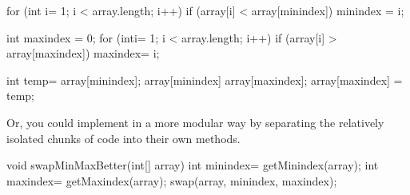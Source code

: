 \documentclass{report}
\begin{document}
\begin{itemize}
\begin{cppcode}
                for (int i= 1; i < array.length; i++) {
                    if (array[i] < array[minindex]) {
                        minindex = i;
                    }
                }

                int maxindex = 0;
                for (inti= 1; i < array.length; i++) {
                    if (array[i] > array[maxindex]) {
                        maxindex= i;
                    }
                }

                int temp= array[minindex];
                array[minindex] array[maxindex];
                array[maxindex] = temp;
            \end{cppcode}
            \bigbreak \noindent 
            Or, you could implement in a more modular way by separating the relatively isolated chunks of code into their own methods.
            \bigbreak \noindent 
            \begin{cppcode}
                void swapMinMaxBetter(int[] array) {
                    int minindex= getMinindex(array);
                    int maxindex= getMaxindex(array);
                    swap(array, minindex, maxindex);
                }


\end{cppcode}
\end{itemize}
\end{document}
